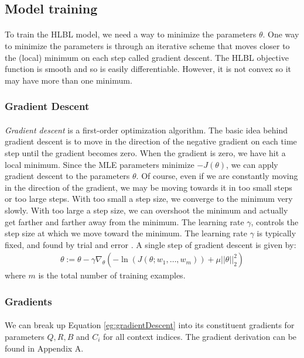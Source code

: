 \subsection{Model training}
\paragraph{}
To train the HLBL model, we need a way to minimize the parameters $\theta$. One way to minimize the parameters is through an iterative scheme that moves closer to the (local) minimum on each step called gradient descent. The HLBL objective function is smooth and so is easily differentiable. However, it is not convex so it may have more than one minimum. 
\subsubsection{Gradient Descent}
\paragraph{}
\emph{Gradient descent} is a first-order optimization algorithm. The basic idea behind gradient descent is to move in the direction of the negative gradient on each time step until the gradient becomes zero. When the gradient is zero, we have hit a local minimum. Since the MLE parameters minimize $-J(\theta)$, we can apply gradient descent to the parameters $\theta$. Of course, even if we are constantly moving in the direction of the gradient, we may be moving towards it in too small steps or too large steps. With too small a step size, we converge to the minimum very slowly. With too large a step size, we can overshoot the minimum and actually get farther and farther away from the minimum. The learning rate $\gamma$, controls the step size at which we move toward the minimum. The learning rate $\gamma$ is typically fixed, and found by trial and error \cite{Elkan2013}.
A single step of gradient descent is given by:
\begin{align}
\theta := \theta - \gamma \nabla_\theta \left( -\ln(J(\theta;w_1,\dots, w_m)) +  \mu ||\theta||^2_2 \right) \label{eg:gradientDescent} 
\end{align}
where $m$ is the total number of training examples.

\subsubsection{Gradients}
\paragraph{}
We can break up Equation \ref{eg:gradientDescent} into its constituent gradients for parameters $Q,R,B$ and $C_i$ for all context indices. The gradient derivation can be found in Appendix A.

